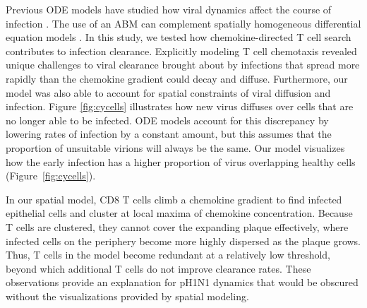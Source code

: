 \documentclass[preprint,10pt,numbers]{elsarticle}
\newcommand{\removed}[1]{}
\newcommand{\new}[1]{#1}
\begin{document}




\removed{Previous ODE models have shown that viral dynamics are critical in determining the course of an infection}\new{Previous ODE models have studied how viral dynamics affect the course of infection} \citep{Handel2008, Lee2009, Miao2010a, Mitchell2011, Saenz2010, Crauste2015, Price2015}.  The use of an ABM can complement spatially homogeneous differential equation models \citep{Beltman2007, Textor2014, Vroomans2012, Zheng2008}.  In this study, we tested how chemokine-directed T cell search contributes to infection clearance.  Explicitly modeling T cell chemotaxis revealed unique challenges to viral clearance brought about by infections that spread more rapidly than the chemokine gradient could decay and diffuse.  Furthermore, our model was also able to account for spatial constraints of viral diffusion and infection.  Figure \ref{fig:cycells} illustrates how new virus diffuses over cells that are no longer able to be infected.  ODE models account for this discrepancy by lowering rates of infection by a constant amount, but this assumes that the proportion of unsuitable virions will always be the same.  Our model visualizes how the early infection has a higher proportion of virus overlapping healthy cells (Figure~\ref{fig:cycells}).  

In our spatial model, CD8 T cells climb a chemokine gradient to find infected epithelial cells and cluster at local maxima of chemokine concentration.  Because T cells are clustered, they cannot cover the expanding plaque effectively, where infected cells on the periphery become more highly dispersed as the plaque grows.  Thus, T cells in the model become redundant at a relatively low threshold, beyond which additional T cells do not improve clearance rates. These observations provide an explanation for pH1N1 dynamics that would be obscured without the visualizations provided by spatial modeling.  %
\end{document}
